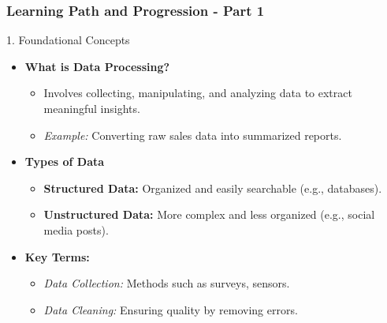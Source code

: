 \documentclass[aspectratio=169]{beamer}
\begin{document}
\begin{frame}[fragile]
    \frametitle{Learning Path and Progression - Part 1}
    \begin{block}{1. Foundational Concepts}
        \begin{itemize}
            \item \textbf{What is Data Processing?}
                \begin{itemize}
                    \item Involves collecting, manipulating, and analyzing data to extract meaningful insights.
                    \item \textit{Example:} Converting raw sales data into summarized reports.
                \end{itemize}

            \item \textbf{Types of Data}
                \begin{itemize}
                    \item \textbf{Structured Data:} Organized and easily searchable (e.g., databases).
                    \item \textbf{Unstructured Data:} More complex and less organized (e.g., social media posts).
                \end{itemize}

            \item \textbf{Key Terms:}
                \begin{itemize}
                    \item \textit{Data Collection:} Methods such as surveys, sensors.
                    \item \textit{Data Cleaning:} Ensuring quality by removing errors.
                \end{itemize}
        \end{itemize}
    \end{block}
\end{frame}
\end{document}
